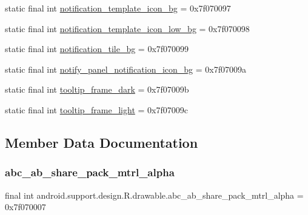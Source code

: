 \begin{DoxyCompactItemize}
\item 
static final int \mbox{\hyperlink{classandroid_1_1support_1_1design_1_1R_1_1drawable_ad7bdcd3290edcef20952638a119d6d7d}{notification\+\_\+template\+\_\+icon\+\_\+bg}} = 0x7f070097
\item 
static final int \mbox{\hyperlink{classandroid_1_1support_1_1design_1_1R_1_1drawable_ae8372977a726225f12d335b46c8cbdd4}{notification\+\_\+template\+\_\+icon\+\_\+low\+\_\+bg}} = 0x7f070098
\item 
static final int \mbox{\hyperlink{classandroid_1_1support_1_1design_1_1R_1_1drawable_aed253f648342d853c111c529ab96e605}{notification\+\_\+tile\+\_\+bg}} = 0x7f070099
\item 
static final int \mbox{\hyperlink{classandroid_1_1support_1_1design_1_1R_1_1drawable_a67fcab12d08eec3c5fd99deabf1e0c18}{notify\+\_\+panel\+\_\+notification\+\_\+icon\+\_\+bg}} = 0x7f07009a
\item 
static final int \mbox{\hyperlink{classandroid_1_1support_1_1design_1_1R_1_1drawable_ad541536a37b940afd49330600c8e6fb1}{tooltip\+\_\+frame\+\_\+dark}} = 0x7f07009b
\item 
static final int \mbox{\hyperlink{classandroid_1_1support_1_1design_1_1R_1_1drawable_aafa93bfc1b95635189723fd95253b79c}{tooltip\+\_\+frame\+\_\+light}} = 0x7f07009c
\end{DoxyCompactItemize}


\subsection{Member Data Documentation}
\mbox{\label{classandroid_1_1support_1_1design_1_1R_1_1drawable_a625cabc6eb240aa7880b51672cf7a8fe}} 
\subsubsection{\texorpdfstring{abc\+\_\+ab\+\_\+share\+\_\+pack\+\_\+mtrl\+\_\+alpha}{abc\_ab\_share\_pack\_mtrl\_alpha}}
{\footnotesize\ttfamily final int android.\+support.\+design.\+R.\+drawable.\+abc\+\_\+ab\+\_\+share\+\_\+pack\+\_\+mtrl\+\_\+alpha = 0x7f070007\hspace{0.3cm}{\ttfamily [static]}}

